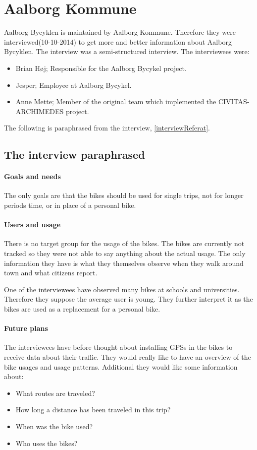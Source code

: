 \section{Aalborg Kommune}
Aalborg Bycyklen is maintained by Aalborg Kommune.
Therefore they were interviewed(10-10-2014) to get more and better information about Aalborg Bycyklen.
The interview was a semi-structured interview.
The interviewees were:
\begin{itemize}
\item Brian Høj; Responsible for the Aalborg Bycykel project.
\item Jesper; Employee at Aalborg Bycykel.
\item Anne Mette; Member of the original team which implemented the CIVITAS-ARCHIMEDES project.
\end{itemize}
The following is paraphrased from the interview, \cref{interviewReferat}.

\subsection{The interview paraphrased}
\paragraph{Goals and needs} \label{interview:goals}
The only goals are that the bikes should be used for single trips, not for longer periods time, or in place of a personal bike.

\paragraph{Users and usage}
There is no target group for the usage of the bikes.
The bikes are currently not tracked so they were not able to say anything about the actual usage.
The only information they have is what they themselves observe when they walk around town and what citizens report.

One of the interviewees have observed many bikes at schools and universities.
Therefore they suppose the average user is young.
They further interpret it as the bikes are used as a replacement for a personal bike.


\paragraph{Future plans}
The interviewees have before thought about installing GPSs in the bikes to receive data about their traffic.
They would really like to have an overview of the bike usages and usage patterns.
Additional they would like some information about:
\begin{itemize}
\item What routes are traveled?
\item How long a distance has been traveled in this trip?
\item When was the bike used?
\item Who uses the bikes?
\end{itemize}

